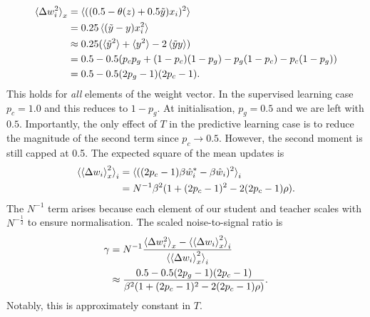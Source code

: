 \documentclass{article}
\begin{document}
\begin{align}
    \braket{\Delta w_i^2}_{x} &= \braket{((0.5 - \theta (z) + 0.5 \tilde{y})x_i)^2}\\
    &= 0.25 \braket{(\tilde{y} - y)x_{i}^2}\\
    &\approx 0.25 (\braket{\tilde{y}^2} + \braket{y^2} - 2 \braket{\tilde{y} y})\\
    &= 0.5 - 0.5 (p_c p_g + (1-p_c)(1-p_g) - p_g(1-p_c) - p_c(1-p_g))\\
    &= 0.5 - 0.5 (2 p_g - 1) (2 p_c - 1).
\end{align}
This holds for \emph{all} elements of the weight vector.
In the supervised learning case $p_c = 1.0$ and this reduces to $1 - p_g$.
At initialisation, $p_g = 0.5$ and we are left with $0.5$.
Importantly, the only effect of $T$ in the predictive learning case is to reduce the magnitude of the second term since $p_c \rightarrow 0.5$.
However, the second moment is still capped at 0.5.
The expected square of the mean updates is
\begin{align}
    \braket{\braket{\Delta w_i}_x^2}_i &= \braket{((2 p_c - 1) \beta \hat{w}^*_i - \beta \hat{w}_i)^2}_i\\
    &= N^{-1} \beta^2 ( 1 + (2p_c-1)^2 - 2 (2 p_c - 1) \rho ).
\end{align}
The $N^{-1}$ term arises because each element of our student and teacher scales with $N^{-\frac12}$ to ensure normalisation.
The scaled noise-to-signal ratio is
\begin{align}
    \gamma &= N^{-1} \frac{\braket{\Delta w_i^2}_{x} - \braket{\braket{\Delta w_i}_x^2}_i}{\braket{\braket{\Delta w_i}_x^2}_i}\\
    &\approx \frac{0.5 - 0.5 (2 p_g - 1) (2 p_c - 1)}{\beta^2 ( 1 + (2p_c-1)^2 - 2 (2 p_c - 1) \rho )}.
\end{align}
Notably, this is approximately constant in $T$.
\end{document}
